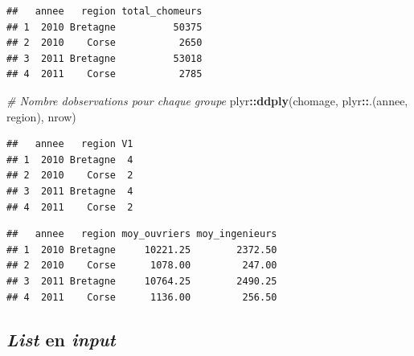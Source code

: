 \documentclass[
  11pt,
]{book}
\newenvironment{Shaded}{\begin{snugshade}}{\end{snugshade}}
\newcommand{\CommentTok}[1]{\textcolor[rgb]{0.56,0.35,0.01}{\textit{#1}}}
\newcommand{\ControlFlowTok}[1]{\textcolor[rgb]{0.13,0.29,0.53}{\textbf{#1}}}
\newcommand{\DataTypeTok}[1]{\textcolor[rgb]{0.13,0.29,0.53}{#1}}
\newcommand{\KeywordTok}[1]{\textcolor[rgb]{0.13,0.29,0.53}{\textbf{#1}}}
\newcommand{\NormalTok}[1]{#1}
\newcommand{\OperatorTok}[1]{\textcolor[rgb]{0.81,0.36,0.00}{\textbf{#1}}}
\newcommand{\StringTok}[1]{\textcolor[rgb]{0.31,0.60,0.02}{#1}}
\numberwithin{equation}{section}
\numberwithin{countremarque}{section}
\begin{document}
\begin{lstlisting}
##   annee   region total_chomeurs
## 1  2010 Bretagne          50375
## 2  2010    Corse           2650
## 3  2011 Bretagne          53018
## 4  2011    Corse           2785
\end{lstlisting}

\begin{Shaded}
\begin{Highlighting}[]
\CommentTok{\# Nombre d\textquotesingle{}observations pour chaque groupe}
\NormalTok{plyr}\OperatorTok{::}\KeywordTok{ddply}\NormalTok{(chomage, plyr}\OperatorTok{::}\NormalTok{.(annee, region), nrow) }
\end{Highlighting}
\end{Shaded}

\begin{lstlisting}
##   annee   region V1
## 1  2010 Bretagne  4
## 2  2010    Corse  2
## 3  2011 Bretagne  4
## 4  2011    Corse  2
\end{lstlisting}

\begin{Shaded}
\end{Shaded}

\begin{lstlisting}
##   annee   region moy_ouvriers moy_ingenieurs
## 1  2010 Bretagne     10221.25        2372.50
## 2  2010    Corse      1078.00         247.00
## 3  2011 Bretagne     10764.25        2490.25
## 4  2011    Corse      1136.00         256.50
\end{lstlisting}

\hypertarget{boucles_vectorisation_plyr_l_ply}{%
\subsection{\texorpdfstring{\emph{List} en \emph{input}}{List en input}}\label{boucles_vectorisation_plyr_l_ply}}
\end{document}
